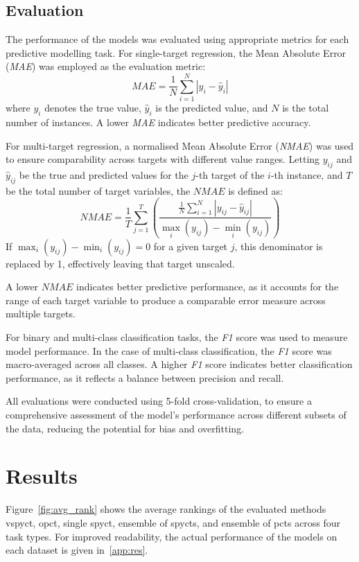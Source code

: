 \documentclass[3p,review,authoryear]{elsarticle}
\begin{document}
\subsection{Evaluation}

The performance of the models was evaluated using appropriate metrics for each predictive modelling task. For single-target regression, the Mean Absolute Error (\textit{MAE}) was employed as the evaluation metric:
\[
\textit{MAE} = \frac{1}{N} \sum_{i=1}^{N} \left| y_i - \hat{y}_i \right|
\]
where \( y_i \) denotes the true value, \(\hat{y}_i\) is the predicted value, and \(N\) is the total number of instances. A lower \textit{MAE} indicates better predictive accuracy.

For multi-target regression, a normalised Mean Absolute Error (\textit{NMAE}) was used to ensure comparability across targets with different value ranges. Letting \(y_{ij}\) and \(\hat{y}_{ij}\) be the true and predicted values for the \(j\)-th target of the \(i\)-th instance, and \(T\) be the total number of target variables, the \(\textit{NMAE}\) is defined as:
\[
\textit{NMAE} = \frac{1}{T} \sum_{j=1}^{T} \left( \frac{\frac{1}{N} \sum_{i=1}^{N} | y_{ij} - \hat{y}_{ij} |}{\max_i(y_{ij}) - \min_i(y_{ij})} \right)
\]
If \(\max_i(y_{ij}) - \min_i(y_{ij}) = 0\) for a given target \(j\), this denominator is replaced by 1, effectively leaving that target unscaled.

A lower \(\textit{NMAE}\) indicates better predictive performance, as it accounts for the range of each target variable to produce a comparable error measure across multiple targets.


For binary and multi-class classification tasks, the \textit{F1} score was used to measure model performance.
In the case of multi-class classification, the \textit{F1} score was macro-averaged across all classes.
A higher \textit{F1} score indicates better classification performance, as it reflects a balance between precision and recall.

All evaluations were conducted using 5-fold cross-validation, to ensure a comprehensive assessment of the model's performance across different subsets of the data, reducing the potential for bias and overfitting.


\section{Results}

Figure~\ref{fig:avg_rank} shows the average rankings of the evaluated methods \gls{vspyct}, \gls{opct}, single \gls{spyct}, ensemble of \glspl{spyct}, and ensemble of \glspl{pct} across four task types.
For improved readability, the actual performance of the models on each dataset is given in~\ref{app:res}.
\end{document}
